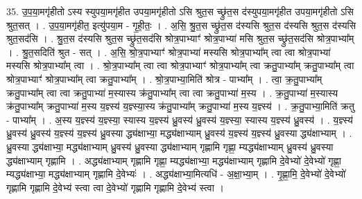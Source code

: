 \documentclass[17pt]{extarticle}
\begin{document}
35. उ॒प॒या॒मगृ॑हीतो ऽस्य स्युपया॒मगृ॑हीत उपया॒मगृ॑हीतो ऽसि श्रुत॒स च्छ्रु॑त॒स द॑स्युपया॒मगृ॑हीत उपया॒मगृ॑हीतो ऽसि श्रुत॒सत् । . उ॒प॒या॒मगृ॑हीत॒ इत्यु॑पया॒म - गृ॒ही॒तः॒ । . अ॒सि॒ श्रु॒त॒स च्छ्रु॑त॒स द॑स्यसि श्रुत॒स द॑स्यसि श्रुत॒स द॑स्यसि श्रुत॒सद॑सि । . श्रु॒त॒स द॑स्यसि श्रुत॒स च्छ्रु॑त॒सद॑सि श्रोत्र॒पाभ्याꣳ॑ श्रोत्र॒पाभ्या॑ मसि श्रुत॒स च्छ्रु॑त॒सद॑सि श्रोत्र॒पाभ्या᳚म् । . श्रु॒त॒सदिति॑ श्रुत - सत् । . अ॒सि॒ श्रो॒त्र॒पाभ्याꣳ॑ श्रोत्र॒पाभ्या॑ मस्यसि श्रोत्र॒पाभ्या᳚म् त्वा त्वा श्रोत्र॒पाभ्या॑ मस्यसि श्रोत्र॒पाभ्या᳚म् त्वा । . श्रो॒त्र॒पाभ्या᳚म् त्वा त्वा श्रोत्र॒पाभ्याꣳ॑ श्रोत्र॒पाभ्या᳚म् त्वा क्रतु॒पाभ्या᳚म् क्रतु॒पाभ्या᳚म् त्वा श्रोत्र॒पाभ्याꣳ॑ श्रोत्र॒पाभ्या᳚म् त्वा क्रतु॒पाभ्या᳚म् । . श्रो॒त्र॒पाभ्या॒मिति॑ श्रोत्र - पाभ्या᳚म् । . त्वा॒ क्र॒तु॒पाभ्या᳚म् क्रतु॒पाभ्या᳚म् त्वा त्वा क्रतु॒पाभ्या॑ म॒स्यास्य क्र॑तु॒पाभ्या᳚म् त्वा त्वा क्रतु॒पाभ्या॑ म॒स्य । . क्र॒तु॒पाभ्या॑ म॒स्यास्य क्र॑तु॒पाभ्या᳚म् क्रतु॒पाभ्या॑ म॒स्य य॒ज्ञ्स्य॑ य॒ज्ञ्स्या॒स्य क्र॑तु॒पाभ्या᳚म् क्रतु॒पाभ्या॑ म॒स्य य॒ज्ञ्स्य॑ । . क्र॒तु॒पाभ्या॒मिति॑ क्रतु - पाभ्या᳚म् । . अ॒स्य य॒ज्ञ्स्य॑ य॒ज्ञ्स्या॒ स्यास्य य॒ज्ञ्स्य॑ ध्रु॒वस्य॑ ध्रु॒वस्य॑ य॒ज्ञ्स्या॒ स्यास्य य॒ज्ञ्स्य॑ ध्रु॒वस्य॑ । . य॒ज्ञ्स्य॑ ध्रु॒वस्य॑ ध्रु॒वस्य॑ य॒ज्ञ्स्य॑ य॒ज्ञ्स्य॑ ध्रु॒वस्या द्ध्य॑क्षाभ्या॒ मद्ध्य॑क्षाभ्याम् ध्रु॒वस्य॑ य॒ज्ञ्स्य॑ य॒ज्ञ्स्य॑ ध्रु॒वस्या द्ध्य॑क्षाभ्याम् । . ध्रु॒वस्या द्ध्य॑क्षाभ्या॒ मद्ध्य॑क्षाभ्याम् ध्रु॒वस्य॑ ध्रु॒वस्या द्ध्य॑क्षाभ्याम् गृह्णामि गृह्णा॒ म्यद्ध्य॑क्षाभ्याम् ध्रु॒वस्य॑ ध्रु॒वस्या द्ध्य॑क्षाभ्याम् गृह्णामि । . अद्ध्य॑क्षाभ्याम् गृह्णामि गृह्णा॒ म्यद्ध्य॑क्षाभ्या॒ मद्ध्य॑क्षाभ्याम् गृह्णामि दे॒वेभ्यो॑ दे॒वेभ्यो॑ गृह्णा॒ म्यद्ध्य॑क्षाभ्या॒ मद्ध्य॑क्षाभ्याम् गृह्णामि दे॒वेभ्यः॑ । . अद्ध्य॑क्षाभ्या॒मित्यधि॑ - अ॒क्षा॒भ्या॒म् । . गृ॒ह्णा॒मि॒ दे॒वेभ्यो॑ दे॒वेभ्यो॑ गृह्णामि गृह्णामि दे॒वेभ्य॑ स्त्वा त्वा दे॒वेभ्यो॑ गृह्णामि गृह्णामि दे॒वेभ्य॑ स्त्वा । \newline
\end{document}
